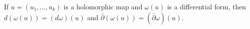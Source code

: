 
If $u = (u_1, \ldots, u_k)$ is a holomorphic map and $\omega(u)$ is a differential form, then $d(\omega(u)) = (d\omega)(u)$ and $\bar{\partial}(\omega(u)) = (\bar{\partial}\omega)(u)$.

